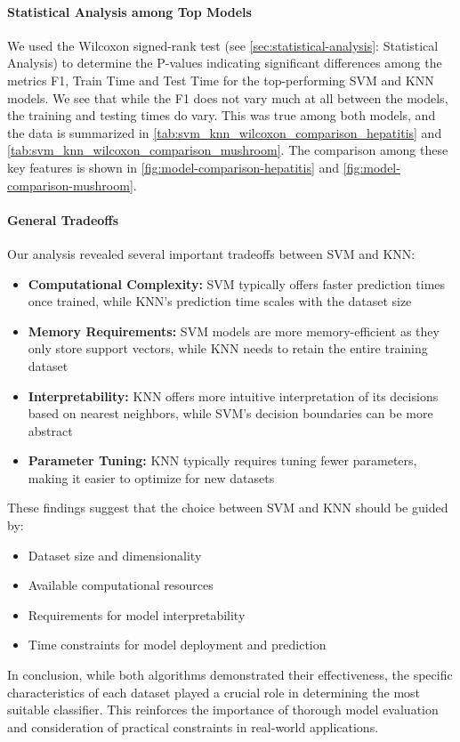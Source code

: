 \paragraph{Statistical Analysis among Top Models}
We used the Wilcoxon signed-rank test (see \autoref{sec:statistical-analysis}: Statistical Analysis) to determine the P-values indicating significant differences among the metrics F1, Train Time and Test Time for the top-performing SVM and KNN models.
We see that while the F1 does not vary much at all between the models, the training and testing times do vary. This was true among both models, and the data is summarized in \autoref{tab:svm_knn_wilcoxon_comparison_hepatitis} and \autoref{tab:svm_knn_wilcoxon_comparison_mushroom}.
The comparison among these key features is shown in \autoref{fig:model-comparison-hepatitis} and \autoref{fig:model-comparison-mushroom}.

\paragraph{General Tradeoffs}
Our analysis revealed several important tradeoffs between SVM and KNN:

\begin{itemize}
    \item \textbf{Computational Complexity:} SVM typically offers faster prediction times once trained, while KNN's prediction time scales with the dataset size
    \item \textbf{Memory Requirements:} SVM models are more memory-efficient as they only store support vectors, while KNN needs to retain the entire training dataset
    \item \textbf{Interpretability:} KNN offers more intuitive interpretation of its decisions based on nearest neighbors, while SVM's decision boundaries can be more abstract
    \item \textbf{Parameter Tuning:} KNN typically requires tuning fewer parameters, making it easier to optimize for new datasets
\end{itemize}

These findings suggest that the choice between SVM and KNN should be guided by:
\begin{itemize}
    \item Dataset size and dimensionality
    \item Available computational resources
    \item Requirements for model interpretability
    \item Time constraints for model deployment and prediction
\end{itemize}

In conclusion, while both algorithms demonstrated their effectiveness, the specific characteristics of each dataset played a crucial role in determining the most suitable classifier. This reinforces the importance of thorough model evaluation and consideration of practical constraints in real-world applications.
